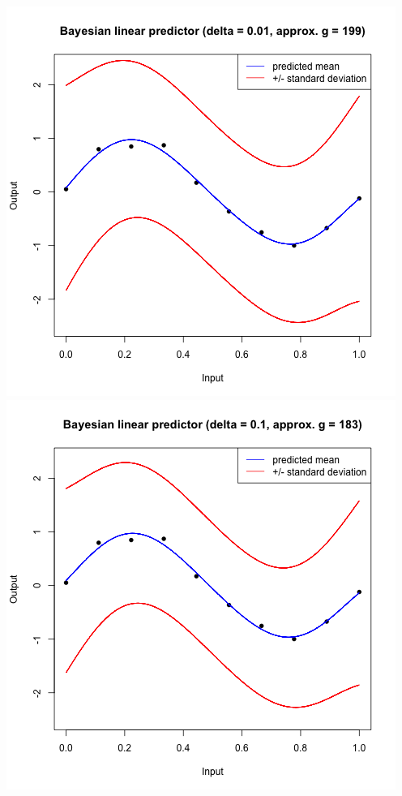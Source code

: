 \documentclass[a4paper, 11pt]{article}
\begin{document}
\begin{center}
\includegraphics[scale=0.6]{ps3F_plot3_3.png}
\includegraphics[scale=0.6]{ps3F_plot3_4.png}

\end{center}
\end{document}
